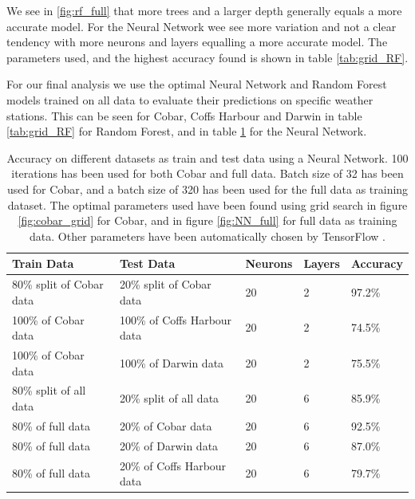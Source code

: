 \documentclass[11pt]{article}
\begin{document}
We see in \ref{fig:rf_full} that more trees and a larger depth generally equals a more accurate model. For the Neural Network wee see more variation and not a clear tendency with more neurons and layers equalling a more accurate model. The parameters used, and the highest accuracy found is shown in table \ref{tab:grid_RF}.

For our final analysis we use the optimal Neural Network and Random Forest models trained on all data to evaluate their predictions on specific weather stations. This can be seen for Cobar, Coffs Harbour and Darwin in table \ref{tab:grid_RF} for Random Forest, and in table \ref{tab:grid_NN} for the Neural Network.

\begin{table}[H]
    \caption{Accuracy on different datasets as train and test data using a Neural Network. 100 iterations has been used for both Cobar and full data. Batch size of 32 has been used for Cobar, and a batch size of 320 has been used for the full data as training dataset.  The optimal parameters used have been found using grid search in figure \ref{fig:cobar_grid} for Cobar, and in figure \ref{fig:NN_full} for full data as training data. Other parameters have been automatically chosen by TensorFlow \cite{tf}.}
    \label{tab:grid_NN}
    \centering
    \begin{tabular}{|l|l|l|l|l|}
        \hline
        \textbf{Train Data}      & \textbf{Test Data}          & \textbf{Neurons} & \textbf{Layers} & \textbf{Accuracy} \\
        \hline
        80\% split of Cobar data & 20\% split of Cobar data    & 20               & 2               & 97.2\%            \\
        \hline
        100\% of Cobar data      & 100\% of Coffs Harbour data & 20               & 2               & 74.5\%            \\
        \hline
        100\% of Cobar data      & 100\% of Darwin data        & 20               & 2               & 75.5\%            \\
        \hline
        80\% split of all data   & 20\% split of all data      & 20               & 6               & 85.9\%            \\
        \hline
        80\% of full data        & 20\% of Cobar data          & 20               & 6               & 92.5\%            \\
        \hline
        80\% of full data        & 20\% of Darwin data         & 20               & 6               & 87.0\%            \\
        \hline
        80\% of full data        & 20\% of Coffs Harbour data  & 20               & 6               & 79.7\%            \\
        \hline
    \end{tabular}
\end{table}
\end{document}
